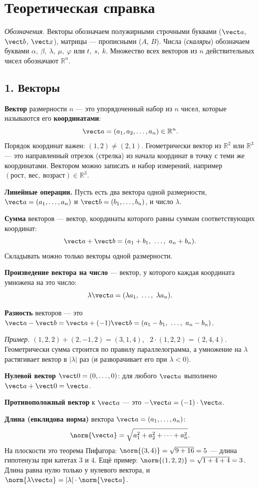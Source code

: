 \section*{Теоретическая справка}
\textit{Обозначения.} Векторы обозначаем полужирными строчными буквами ($\vect a$, $\vect b$, $\vect x$), матрицы --- прописными ($A$, $B$). Числа (\emph{скаляры}) обозначаем буквами $\alpha,\ \beta,\ \lambda,\ \mu,\ \varphi$ или $t,\ s,\ k$. Множество всех векторов из $n$ действительных чисел обозначают $\mathbb R^n$.

\subsection*{1. Векторы}
\textbf{Вектор} размерности $n$ --- это упорядоченный набор из $n$ чисел, которые называются его \textbf{координатами}:
\[
\vect a=(a_1,a_2,\dots,a_n)\in\mathbb R^n .
\]
Порядок координат важен: $(1,2)\ne(2,1)$. Геометрически вектор из $\mathbb R^2$ или $\mathbb R^3$ --- это направленный отрезок (стрелка) из начала координат в точку с теми же координатами. Вектором можно записать и набор измерений, например $(\text{рост},\ \text{вес},\ \text{возраст})\in\mathbb R^3$.

\textbf{Линейные операции.} Пусть есть два вектора одной размерности, $\vect a=(a_1,\dots,a_n)$ и $\vect b=(b_1,\dots,b_n)$, и число $\lambda$.

\textbf{Сумма} векторов --- вектор, координаты которого равны суммам соответствующих координат:
\[
\vect a+\vect b=(a_1+b_1,\ \dots,\ a_n+b_n).
\]
Складывать можно только векторы одной размерности.

\textbf{Произведение вектора на число} --- вектор, у которого каждая координата умножена на это число:
\[
\lambda\vect a=(\lambda a_1,\ \dots,\ \lambda a_n).
\]

\textbf{Разность} векторов --- это $\vect a-\vect b=\vect a+(-1)\vect b=(a_1-b_1,\ \dots,\ a_n-b_n)$.

\textit{Пример.} $(1,2,2)+(2,-1,2)=(3,1,4)$, \ $2\cdot(1,2,2)=(2,4,4)$. Геометрически сумма строится по правилу параллелограмма, а умножение на $\lambda$ растягивает вектор в $|\lambda|$ раз (и разворачивает его при $\lambda<0$).

\textbf{Нулевой вектор} $\vect 0=(0,\dots,0)$: для любого $\vect a$ выполнено $\vect a+\vect 0=\vect a$.

\textbf{Противоположный вектор} к $\vect a$ --- это $-\vect a=(-1)\cdot\vect a$.

\textbf{Длина (евклидова норма)} вектора $\vect a=(a_1,\dots,a_n)$:
\[
\norm{\vect a}=\sqrt{a_1^2+a_2^2+\dots+a_n^2}.
\]
На плоскости это теорема Пифагора: $\norm{(3,4)}=\sqrt{9+16}=5$ --- длина гипотенузы при катетах $3$ и $4$. Ещё пример: $\norm{(1,2,2)}=\sqrt{1+4+4}=3$. Длина равна нулю только у нулевого вектора, и $\norm{\lambda\vect a}=|\lambda|\cdot\norm{\vect a}$.

